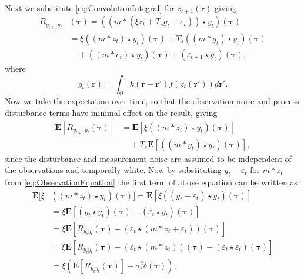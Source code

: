 \documentclass[10pt,twocolumn,twoside]{IEEEtran}
\begin{document}
Next we substitute \eqref{eq:ConvolutionIntegral} for $z_{t+1}(\mathbf{r})$ giving 
\begin{align}
	R_{y_{t+1}y_t}&(\boldsymbol{\tau}) = (\left(m \ast \left(\xi z_t +  T_s g_t + e_t\right)\right) \star y_t)(\boldsymbol{\tau}) \nonumber\\
	&= \xi\left(\left(m \ast z_t\right) \star y_t \right)(\boldsymbol{\tau})+ T_s \left(\left(m\ast g_t\right)\star y_t \right)(\boldsymbol{\tau}) \nonumber\\
	&\quad+ \left(\left(m\ast e_t\right)\star y_t \right)(\boldsymbol{\tau})+ (\varepsilon_{t+1} \star y_t)(\boldsymbol{\tau}),
\end{align}
where
\begin{equation}\label{eq:averagefiringrate}
	g_t(\mathbf r)=\int_{\Omega}k\left(\mathbf{r}-\mathbf{r}'\right)f(z_{t}\left(\mathbf{r}'\right))d\mathbf{r}'.
\end{equation}
Now we take the expectation over time, so that the observation noise and process disturbance terms have minimal effect on the result, giving 
\begin{align}\label{eq:ExpectationToCancelNoise}
	\mathbf{E}[R_{y_{t+1}y_t}(\boldsymbol{\tau})] &= \mathbf{E}[\xi\left(\left(m \ast z_t\right) \star y_t \right)(\boldsymbol{\tau})] \nonumber \\
	 &\quad+ T_s \mathbf{E}[\left(\left(m\ast g_t\right)\star y_t \right)(\boldsymbol{\tau})],
\end{align}
since the disturbance and measurement noise are assumed to be independent of the observations and temporally white. Now by substituting $y_t - \varepsilon_t$ for $m\ast z_t$ from \eqref{eq:ObservationEquation} the first term of above equation can be written as
\begin{align}
	\mathbf{E}[\xi&\left(\left(m \ast z_t \right) \star y_t \right)(\boldsymbol{\tau})] = \mathbf{E}\left[\xi\left(\left(y_t-\varepsilon_t\right) \star y_t \right)(\boldsymbol{\tau})\right] \nonumber \\
	&= \xi \mathbf{E}\left[ (y_t \star y_t)(\boldsymbol{\tau}) - \left(\varepsilon_t\star y_t \right)(\boldsymbol{\tau})\right] \nonumber \\
	&= \xi\mathbf{E}[ R_{y_ty_t}(\boldsymbol{\tau})  - \left(\varepsilon_t \star (m\ast z_t + \varepsilon_t)\right) (\boldsymbol{\tau})] \nonumber \\
	&=\xi\mathbf{E}[ R_{y_ty_t}(\boldsymbol{\tau}) -\left(\varepsilon_t\star (m\ast z_t)\right)(\boldsymbol{\tau}) - (\varepsilon_t\star\varepsilon_t)(\boldsymbol{\tau})] \nonumber\\ 
	&= \xi\left(\mathbf{E}[ R_{y_ty_t}(\boldsymbol{\tau})] - \sigma_{\varepsilon}^2 \delta(\boldsymbol{\tau})\right), \label{eq:FirstTermReduced}
\end{align}
\end{document}
